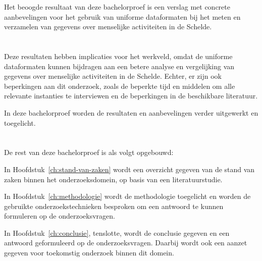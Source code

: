 Het beoogde resultaat van deze bachelorproef is een verslag met concrete aanbevelingen voor het gebruik van uniforme dataformaten bij het meten en verzamelen van gegevens over menselijke activiteiten in de Schelde.

\section{}%
\label{sec:Conclusies-aanbevelingen-beperkingen}

Deze resultaten hebben implicaties voor het werkveld, omdat de uniforme dataformaten kunnen bijdragen aan een betere analyse en vergelijking van gegevens over menselijke activiteiten in de Schelde. Echter, er zijn ook beperkingen aan dit onderzoek, zoals de beperkte tijd en middelen om alle relevante instanties te interviewen en de beperkingen in de beschikbare literatuur.

In deze bachelorproef worden de resultaten en aanbevelingen verder uitgewerkt en toegelicht.

\section{}%
\label{sec:opzet-bachelorproef}


De rest van deze bachelorproef is als volgt opgebouwd:

In Hoofdstuk~\ref{ch:stand-van-zaken} wordt een overzicht gegeven van de stand van zaken binnen het onderzoeksdomein, op basis van een literatuurstudie.

In Hoofdstuk~\ref{ch:methodologie} wordt de methodologie toegelicht en worden de gebruikte onderzoekstechnieken besproken om een antwoord te kunnen formuleren op de onderzoeksvragen.


In Hoofdstuk~\ref{ch:conclusie}, tenslotte, wordt de conclusie gegeven en een antwoord geformuleerd op de onderzoeksvragen. Daarbij wordt ook een aanzet gegeven voor toekomstig onderzoek binnen dit domein.